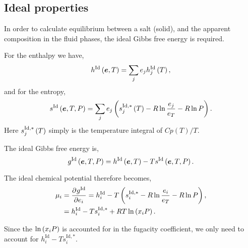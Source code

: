 \documentclass[english]{../thermomemo/thermomemo}
\newcommand*{\pd}[3][]{\frac{\partial^{#1}#2}{\partial{#3}^{#1}}}%
\newcommand*{\vektor}[1]{\boldsymbol{#1}}%
\newcommand{\lp}{\ensuremath{\left(}\xspace}
\newcommand{\rp}{\ensuremath{\right)}\xspace}
\newcommand{\ideal}{\ensuremath{\text{Id}}\xspace}
\begin{document}
\subsection{Ideal properties}
In order to calculate equilibrium between a salt (solid), and the
apparent composition in the fluid phases, the ideal Gibbs free energy
is required.

For the enthalpy we have,
\begin{equation}
  h^\ideal \lp \vektor{e},  T \rp = \sum_j e_j h_j^\ideal \lp T \rp,
\label{eq:id_enthalpy}
\end{equation}
and for the entropy,
\begin{equation}
  s^\ideal \lp \vektor{e},  T, P \rp = \sum_j e_j \lp s_j^{\ideal,*} \lp T \rp  - R \ln \frac{e_j}{e_T} - R \ln P \rp.
\label{eq:id_entropy}
\end{equation}
Here $s_j^{\ideal,*} \lp T \rp$ simply is the temperature integral of $Cp(T)/T$.

The ideal Gibbs free energy is,
\begin{equation}
  g^\ideal \lp \vektor{e},  T, P \rp = h^\ideal \lp \vektor{e},  T \rp - T s^\ideal \lp \vektor{e},  T, P \rp.
\label{eq:id_gibbs}
\end{equation}

The ideal chemical potential therefore becomes,
\begin{align}
  \mu_i &= \pd{g^\ideal}{e_i} = h^\ideal_i - T \lp s_i^{\ideal,*}  - R \ln \frac{e_i}{e_T} - R \ln P \rp, \\
  &= h^\ideal_i - T s_i^{\ideal,*}  + RT \ln \lp x_i P \rp.
\label{eq:id_chempot}
\end{align}

Since the $\ln \lp x_i P \rp$ is accounted for in the fugacity
coefficient, we only need to account for $h^\ideal_i - T
s_i^{\ideal,*}$.

\clearpage


\end{document}
